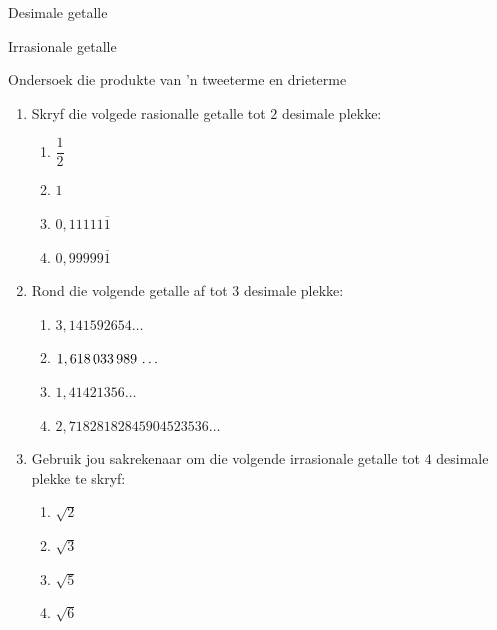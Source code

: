 \begin{Aktiwiteit}{Desimale getalle}
\begin{aktiwiteit}{Irrasionale getalle}
\begin{aktiwiteit}{Ondersoek die produkte van 'n tweeterme en drieterme}
\begin{eocexercises}{}
\begin{enumerate}[itemsep=5pt, label=\textbf{\arabic*}. ]
\item Skryf die volgede rasionalle getalle tot $2$ desimale plekke:
    \begin{enumerate}[itemsep=5pt, label=\textbf{\alph*}. ] 
    \item $\dfrac{1}{2}$
    \item $1$
    \item $0,11111\overline{1}$
    \item $0,99999\overline{1}$
    \end{enumerate}

\item Rond die volgende getalle af tot $3$ desimale plekke:
\begin{multicols}{2}
    \begin{enumerate}[itemsep=5pt, label=\textbf{\alph*}. ] 
    \item $3,141592654\ldots$
    \item $1,618\phantom{\rule{0.166667em}{0ex}}033\phantom{\rule{0.166667em}{0ex}}989\phantom{\rule{0.166667em}{0ex}}\ldots$
    \item $1,41421356\ldots$
    \item $2,71828182845904523536\ldots$
    \end{enumerate}
\end{multicols}
\item Gebruik jou sakrekenaar om die volgende irrasionale getalle tot $4$ desimale plekke te skryf:
\begin{multicols}{2}
    \begin{enumerate}[itemsep=5pt, label=\textbf{\alph*}. ] 
    \item $\sqrt{2}$
    \item $\sqrt{3}$
    \item $\sqrt{5}$
    \item $\sqrt{6}$
    \end{enumerate}
\end{multicols}


\end{enumerate}
\end{eocexercises}
\end{aktiwiteit}
\end{aktiwiteit}
\end{Aktiwiteit}
